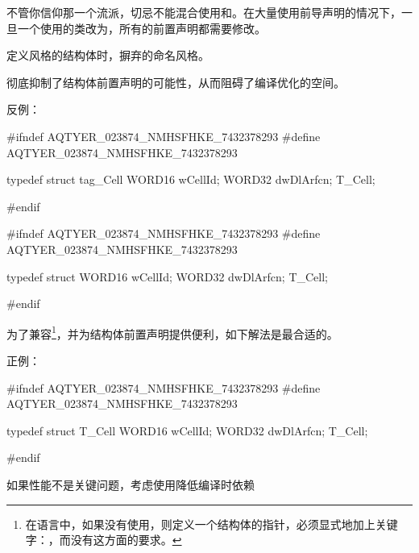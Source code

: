 \begin{content}
不管你信仰那一个流派，切忌不能混合使用和。在大量使用前导声明的情况下，一旦一个使用的类改为，所有的前置声明都需要修改。

\begin{regulation}
定义\clang{}风格的结构体时，摒弃的命名风格。
\end{regulation}

彻底抑制了结构体前置声明的可能性，从而阻碍了编译优化的空间。

反例：
\begin{leftbar}
\begin{c++}[caption={radio/domain/Cell.h}]
#ifndef AQTYER_023874_NMHSFHKE_7432378293
#define AQTYER_023874_NMHSFHKE_7432378293

typedef struct tag_Cell
{
    WORD16 wCellId;
    WORD32 dwDlArfcn;
} T_Cell;

#endif
\end{c++}
\end{leftbar}

\begin{leftbar}
\begin{c++}[caption={radio/domain/Cell.h}]
#ifndef AQTYER_023874_NMHSFHKE_7432378293
#define AQTYER_023874_NMHSFHKE_7432378293

typedef struct
{
    WORD16 wCellId;
    WORD32 dwDlArfcn;
} T_Cell;

#endif
\end{c++}
\end{leftbar}

为了兼容\clang{}\footnote{在\clang{}语言中，如果没有使用，则定义一个结构体的指针，必须显式地加上关键字：，而\cpp{}没有这方面的要求。}，并为结构体前置声明提供便利，如下解法是最合适的。

正例：
\begin{leftbar}
\begin{c++}[caption={radio/domain/Cell.h}]
#ifndef AQTYER_023874_NMHSFHKE_7432378293
#define AQTYER_023874_NMHSFHKE_7432378293

typedef struct T_Cell
{
    WORD16 wCellId;
    WORD32 dwDlArfcn;
} T_Cell;

#endif
\end{c++}
\end{leftbar}

\begin{advise}
如果性能不是关键问题，考虑使用降低编译时依赖
\end{advise}


\end{content}
